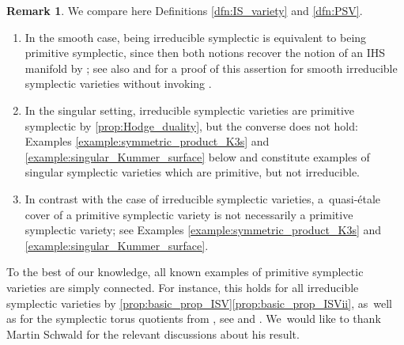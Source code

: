 \documentclass[JEP,XML,SOM,Unicode,published]{cedram}
\theoremstyle{plain}
\theoremstyle{definition}
\newtheorem{rem}[thm]{Remark}
\begin{document}
\begin{rem}
\label{rem:irreducible_vs_primitive_symplectic}
We compare here Definitions \ref{dfn:IS_variety} and \ref{dfn:PSV}.
\begin{enumerate}
\item\label{rem:irreducible_vs_primitive_symplectici}
In the smooth case, being irreducible symplectic is equivalent to being primitive symplectic, since then both notions recover the notion of an IHS manifold by \cite[Th.\,1]{Schwald22}; see also \cite[Rem.\,8.19]{GKP16b} and \cite[Rem.\,2]{Schwald22} for a proof of this assertion for smooth irreducible symplectic varieties without invoking \cite[Th.\,1]{Schwald22}.

\item\label{rem:irreducible_vs_primitive_symplecticii}
In the singular setting, irreducible symplectic varieties are primitive symplectic by \autoref{prop:Hodge_duality}, but the converse does not hold: Examples \ref{example:symmetric_product_K3s} and \ref{example:singular_Kummer_surface} below and \cite[Ex.\,26]{Schwald20} constitute examples of singular symplectic varieties which are primitive, but not irreducible.

\item\label{rem:irreducible_vs_primitive_symplecticiii}
In contrast with the case of irreducible symplectic varieties, a~quasi-étale cover of a primitive symplectic variety is not necessarily a primitive symplectic variety; see Examples \ref{example:symmetric_product_K3s} and \ref{example:singular_Kummer_surface}.
\end{enumerate}
\end{rem}

To the best of our knowledge, all known examples of primitive symplectic varieties are simply connected. For instance, this holds for all irreducible symplectic varieties by \autoref{prop:basic_prop_ISV}\eqref{prop:basic_prop_ISVii}, as~well as for the symplectic torus quotients from \cite[Lem.\,5]{Schwald22}, see \cite[Lem.\,1.2]{Fujiki83b} and \cite[\S 6]{Schwald22}. We~would like to thank Martin Schwald for the relevant discussions about his result.
\end{document}
